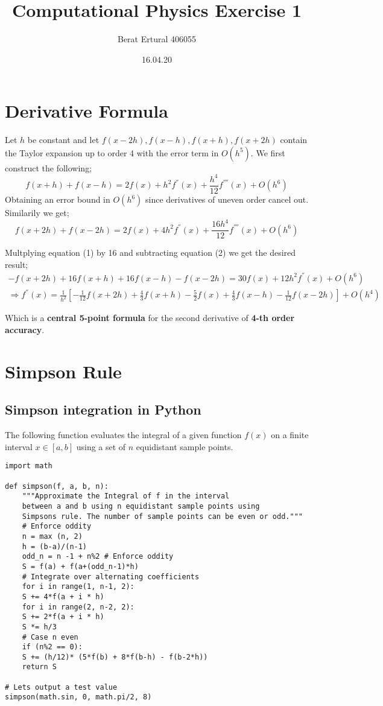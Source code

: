 \documentclass[11pt]{article}
\author{Berat Ertural 406055}
\date{16.04.20}
\title{Computational Physics Exercise 1}
\begin{document}
\maketitle

\section{Derivative Formula}
\label{sec:org8214b0c}

Let \(h\) be constant and let \(f(x-2h),f(x-h),f(x+h),f(x+2h)\) 
contain the Taylor expansion up to order 4 with the error term in \(O(h^5)\). 
We first construct the following;
\begin{equation}
f(x+h) + f(x-h) = 2f(x)+h^2 f^{''}(x)+ \frac{h^4}{12} f^{''''}(x) + O(h^6)
\end{equation}
Obtaining an error bound in \(O(h^6)\) since derivatives of uneven order cancel out. Similarily we get;
\begin{equation}
f(x+2h) + f(x-2h) = 2f(x)+4 h^2 f^{''}(x)+ \frac{16 h^4}{12} f^{''''}(x) +O(h^6)
\end{equation}

Multplying equation (1) by 16 and subtracting equation (2) we get the desired result;
\begin{multline}
-f(x+2h)+16f(x+h)+16f(x-h)-f(x-2h) = 30f(x)+ 12 h^2 f^{''}(x) + O(h^6) \\
\Rightarrow f^{''}(x) = \frac{1}{h^2}[-\frac{1}{12}f(x+2h)+\frac{4}{3}f(x+h)-\frac{5}{2}f(x)+\frac{4}{3}f(x-h)-\frac{1}{12}f(x-2h)] + O(h^4)
\end{multline}

Which is a \textbf{central 5-point formula} for the second derivative of \textbf{4-th order accuracy}.

\section{Simpson Rule}
\label{sec:org9f26ecc}
\subsection{Simpson integration in Python}
\label{sec:org423c4a2}
The following function evaluates the integral of a given function \(f(x)\) on a finite interval 
\(x \in [a,b]\) using a set of \(n\) equidistant sample points.

\begin{verbatim}
import math

def simpson(f, a, b, n):
    """Approximate the Integral of f in the interval
    between a and b using n equidistant sample points using 
    Simpsons rule. The number of sample points can be even or odd."""
    # Enforce oddity
    n = max (n, 2)
    h = (b-a)/(n-1)
    odd_n = n -1 + n%2 # Enforce oddity
    S = f(a) + f(a+(odd_n-1)*h)
    # Integrate over alternating coefficients
    for i in range(1, n-1, 2):
	S += 4*f(a + i * h)
    for i in range(2, n-2, 2):
	S += 2*f(a + i * h)
    S *= h/3
    # Case n even
    if (n%2 == 0):
	S += (h/12)* (5*f(b) + 8*f(b-h) - f(b-2*h))
    return S

# Lets output a test value
simpson(math.sin, 0, math.pi/2, 8)

\end{verbatim}
\end{document}
